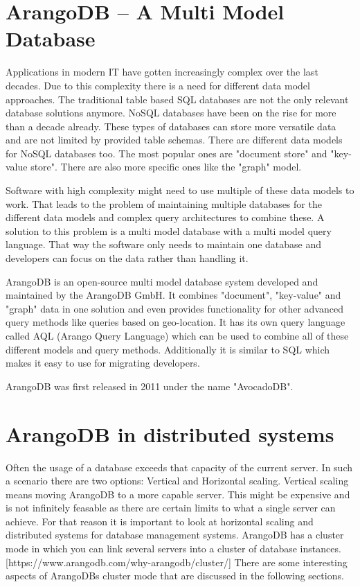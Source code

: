 
\section{ArangoDB -- A Multi Model Database}
Applications in modern IT have gotten increasingly complex over the last decades. Due to this complexity there is a need for different data model approaches. The traditional table based SQL databases are not the only relevant database solutions anymore. NoSQL databases have been on the rise for more than a decade already. These types of databases can store more versatile data and are not limited by provided table schemas. There are different data models for NoSQL databases too. The most popular ones are "document store" and "key-value store". There are also more specific ones like the "graph" model.

Software with high complexity might need to use multiple of these data models to work. That leads to the problem of maintaining multiple databases for the different data models and complex query architectures to combine these. A solution to this problem is a multi model database with a multi model query language. That way the software only needs to maintain one database and developers can focus on the data rather than handling it.

ArangoDB is an open-source multi model database system developed and maintained by the ArangoDB GmbH. It combines "document", "key-value" and "graph" data in one solution and even provides functionality for other advanced query methods like queries based on geo-location. It has its own query language called AQL (Arango Query Language) which can be used to combine all of these different models and query methods. Additionally it is similar to SQL which makes it easy to use for migrating developers.

ArangoDB was first released in 2011 under the name "AvocadoDB". 

\cite{ArangoHomepage}

\section{ArangoDB in distributed systems}
Often the usage of a database exceeds that capacity of the current server. In such a scenario there are two options: Vertical and Horizontal scaling. Vertical scaling means moving ArangoDB to a more capable server. This might be expensive and is not infinitely feasable as there are certain limits to what a single server can achieve. For that reason it is important to look at horizontal scaling and distributed systems for database management systems. ArangoDB has a cluster mode in which you can link several servers into a cluster of database instances. [https://www.arangodb.com/why-arangodb/cluster/] There are some interesting aspects of ArangoDBs cluster mode that are discussed in the following sections.


